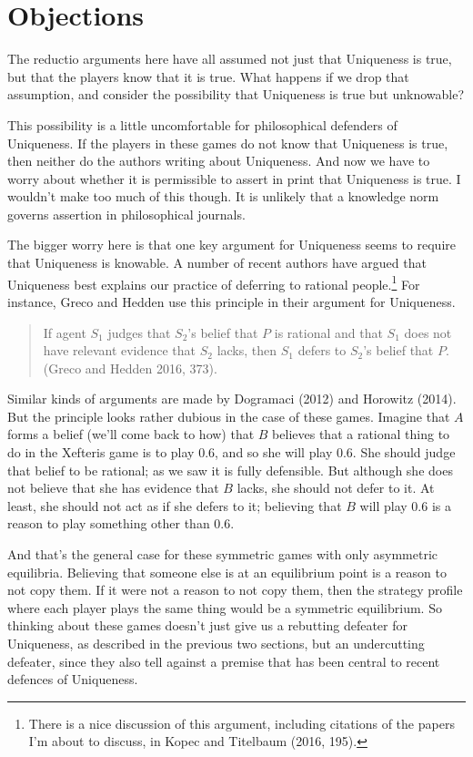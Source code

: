 \documentclass[
  11pt,
]{article}
\begin{document}
\hypertarget{objections}{%
\section{Objections}\label{objections}}

The reductio arguments here have all assumed not just that Uniqueness is true, but that the players know that it is true. What happens if we drop that assumption, and consider the possibility that Uniqueness is true but unknowable?

This possibility is a little uncomfortable for philosophical defenders of Uniqueness. If the players in these games do not know that Uniqueness is true, then neither do the authors writing about Uniqueness. And now we have to worry about whether it is permissible to assert in print that Uniqueness is true. I wouldn't make too much of this though. It is unlikely that a knowledge norm governs assertion in philosophical journals.

The bigger worry here is that one key argument for Uniqueness seems to require that Uniqueness is knowable. A number of recent authors have argued that Uniqueness best explains our practice of deferring to rational people.\footnote{There is a nice discussion of this argument, including citations of the papers I'm about to discuss, in Kopec and Titelbaum (2016, 195).} For instance, Greco and Hedden use this principle in their argument for Uniqueness.

\begin{quote}
If agent \(S_1\) judges that \(S_2\)'s belief that \(P\) is rational and that \(S_1\) does not have relevant evidence that \(S_2\) lacks, then \(S_1\) defers to \(S_2\)'s belief that \(P\). (Greco and Hedden 2016, 373).
\end{quote}

Similar kinds of arguments are made by Dogramaci (2012) and Horowitz (2014). But the principle looks rather dubious in the case of these games. Imagine that \(A\) forms a belief (we'll come back to how) that \(B\) believes that a rational thing to do in the Xefteris game is to play 0.6, and so she will play 0.6. She should judge that belief to be rational; as we saw it is fully defensible. But although she does not believe that she has evidence that \(B\) lacks, she should not defer to it. At least, she should not act as if she defers to it; believing that \(B\) will play 0.6 is a reason to play something other than 0.6.

And that's the general case for these symmetric games with only asymmetric equilibria. Believing that someone else is at an equilibrium point is a reason to not copy them. If it were not a reason to not copy them, then the strategy profile where each player plays the same thing would be a symmetric equilibrium. So thinking about these games doesn't just give us a rebutting defeater for Uniqueness, as described in the previous two sections, but an undercutting defeater, since they also tell against a premise that has been central to recent defences of Uniqueness.
\end{document}
